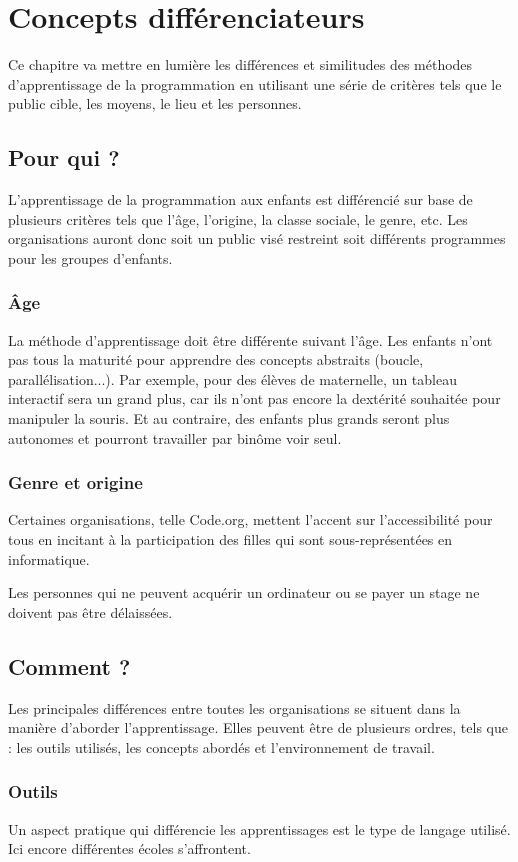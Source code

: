 \section{Concepts différenciateurs}
\label{concepts}
Ce chapitre va mettre en lumière les différences et similitudes des méthodes d'apprentissage de la programmation en utilisant une série de critères tels que le public cible, les moyens, le lieu et les personnes.
\subsection{Pour qui ?}
L'apprentissage de la programmation aux enfants est différencié sur base de plusieurs critères tels que l'âge, l'origine, la classe sociale, le genre, etc. Les organisations auront donc soit un public visé restreint soit différents programmes pour les groupes d'enfants.

\subsubsection{Âge}
La méthode d'apprentissage doit être différente suivant l'âge. Les enfants n'ont pas tous la maturité pour apprendre des concepts abstraits (boucle, parallélisation...). Par exemple, pour des élèves de maternelle, un tableau interactif sera un grand plus, car ils n'ont pas encore la dextérité souhaitée pour manipuler la souris. Et au contraire, des enfants plus grands seront plus autonomes et pourront travailler par binôme voir seul.

\subsubsection{Genre et origine}
Certaines organisations, telle Code.org, mettent l'accent sur l’accessibilité pour tous en incitant à la participation des filles qui sont sous-représentées en informatique.

Les personnes qui ne peuvent acquérir un ordinateur ou se payer un stage ne doivent pas être délaissées.

\subsection{Comment ?}
Les principales différences entre toutes les organisations se situent dans la manière d'aborder l'apprentissage. Elles peuvent être de plusieurs ordres, tels que : les outils utilisés, les concepts abordés et l'environnement de travail.

\subsubsection{Outils}
Un aspect pratique qui différencie les apprentissages est le type de langage utilisé. Ici encore différentes écoles s'affrontent.

